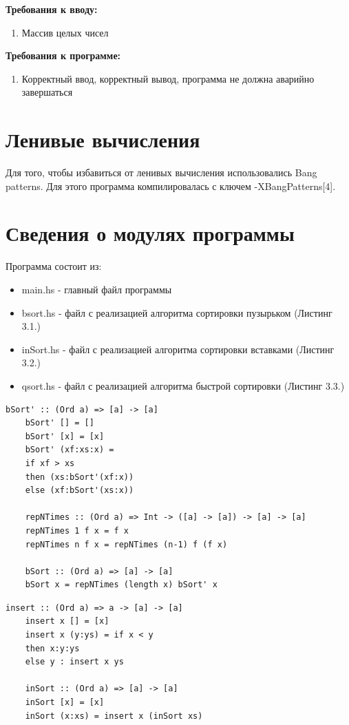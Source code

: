 \documentclass[12pt]{report}
\begin{document}
\textbf{Требования к вводу:}
\begin{enumerate}
	\item Массив целых чисел
\end{enumerate}

\textbf{Требования к программе:}
\begin{enumerate}
	\item Корректный ввод, корректный вывод, программа не должна аварийно завершаться
\end{enumerate}

\section{Ленивые вычисления}

Для того, чтобы избавиться от ленивых вычисления использовались Bang patterns.
Для этого программа компилировалась с ключем -XBangPatterns[4].

\section{Сведения о модулях программы}
Программа состоит из:
\begin{itemize}
	\item main.hs - главный файл программы
	\item bsort.hs - файл с реализацией алгоритма сортировки пузырьком (Листинг 3.1.)
	\item inSort.hs - файл с реализацией алгоритма сортировки вставками (Листинг 3.2.)
	\item qsort.hs - файл с реализацией алгоритма быстрой сортировки (Листинг 3.3.)
\end{itemize}

\begin{lstlisting}[label=some-code,caption=Сортировка пузырьком]
	bSort' :: (Ord a) => [a] -> [a]
	bSort' [] = []
	bSort' [x] = [x]
	bSort' (xf:xs:x) = 
	if xf > xs
	then (xs:bSort'(xf:x))
	else (xf:bSort'(xs:x))
	
	repNTimes :: (Ord a) => Int -> ([a] -> [a]) -> [a] -> [a]
	repNTimes 1 f x = f x
	repNTimes n f x = repNTimes (n-1) f (f x)
	
	bSort :: (Ord a) => [a] -> [a]
	bSort x = repNTimes (length x) bSort' x 
\end{lstlisting}

\begin{lstlisting}[label=some-code,caption=Сортировка вставками]
	insert :: (Ord a) => a -> [a] -> [a]
	insert x [] = [x]
	insert x (y:ys) = if x < y 
	then x:y:ys 
	else y : insert x ys
	
	inSort :: (Ord a) => [a] -> [a]
	inSort [x] = [x]
	inSort (x:xs) = insert x (inSort xs)       
\end{lstlisting}
\end{document}
